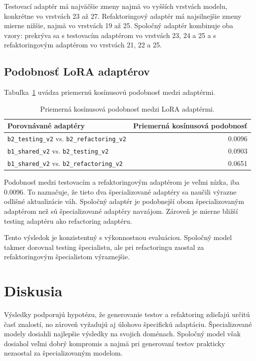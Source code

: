 \documentclass[11pt,a4paper]{article}
\newcommand{\modeltest}{\texttt{b2\_testing\_v2}}
\newcommand{\modelref}{\texttt{b2\_refactoring\_v2}}
\newcommand{\modelshared}{\texttt{b1\_shared\_v2}}
\begin{document}
Testovací adaptér má najväčšie zmeny najmä vo vyšších vrstvách modelu, konkrétne vo vrstvách 23 až 27. Refaktoringový adaptér má najsilnejšie zmeny mierne nižšie, najmä vo vrstvách 19 až 25. Spoločný adaptér kombinuje oba vzory: prekrýva sa s testovacím adaptérom vo vrstvách 23, 24 a 25 a s refaktoringovým adaptérom vo vrstvách 21, 22 a 25.

\subsection{Podobnosť LoRA adaptérov}

Tabuľka~\ref{tab:lora-similarity} uvádza priemernú kosínusovú podobnosť medzi adaptérmi.

\begin{table}[h]
\centering
\small
\begin{tabular}{lr}
\toprule
Porovnávané adaptéry & Priemerná kosínusová podobnosť \\
\midrule
\modeltest{} vs. \modelref & 0.0096 \\
\modelshared{} vs. \modeltest & 0.0903 \\
\modelshared{} vs. \modelref & 0.0651 \\
\bottomrule
\end{tabular}
\caption{Priemerná kosínusová podobnosť medzi LoRA adaptérmi.}
\label{tab:lora-similarity}
\end{table}

Podobnosť medzi testovacím a refaktoringovým adaptérom je veľmi nízka, iba 0.0096. To naznačuje, že tieto dva špecializované adaptéry sa naučili výrazne odlišné aktualizácie váh. Spoločný adaptér je podobnejší obom špecializovaným adaptérom než sú špecializované adaptéry navzájom. Zároveň je mierne bližší testing adaptéru ako refactoring adaptéru.

Tento výsledok je konzistentný s výkonnostnou evaluáciou. Spoločný model takmer dorovnal testing špecialistu, ale pri refactoringu zaostal za refaktoringovým špecialistom výraznejšie.

\section{Diskusia}

Výsledky podporujú hypotézu, že generovanie testov a refaktoring zdieľajú určitú časť znalostí, no zároveň vyžadujú aj úlohovo špecifickú adaptáciu. Špecializované modely dosiahli najlepšie výsledky na svojich doménach. Spoločný model však dosiahol veľmi dobrý kompromis a najmä pri generovaní testov prakticky nezaostal za špecializovaným modelom.
\end{document}
